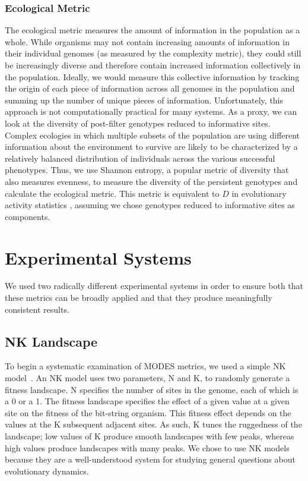 \documentclass[letterpaper]{article}
\begin{document}
\subsubsection{Ecological Metric}
The ecological metric measures the amount of information in the population as a whole. While organisms may not contain increasing amounts of information in their individual genomes (as measured by the complexity metric), they could still be increasingly diverse and therefore contain increased information collectively in the population. Ideally, we would measure this collective information by tracking the origin of each piece of information across all genomes in the population and summing up the number of unique pieces of information. Unfortunately, this approach is not computationally practical for many systems. As a proxy, we can look at the diversity of post-filter genotypes reduced to informative sites. Complex ecologies in which multiple subsets of the population are using different information about the environment to survive are likely to be characterized by a relatively balanced distribution of individuals across the various successful phenotypes. Thus, we use Shannon entropy, a popular metric of diversity that also measures evenness, to measure the diversity of the persistent genotypes and calculate the ecological metric. This metric is equivalent to $D$ in evolutionary activity statistics \citep{bedau_comparison_1997}, assuming we chose genotypes reduced to informative sites as components.

\section{Experimental Systems}

We used two radically different experimental systems in order to ensure both that these metrics can be broadly applied and that they produce meaningfully consistent results.

\subsection{NK Landscape}
To begin a systematic examination of MODES metrics, we used a simple NK model~\citep{kauffman_towards_1987}. An NK model uses two parameters, N and K, to randomly generate a fitness landscape. N specifies the number of sites in the genome, each of which is a 0 or a 1. The fitness landscape specifies the effect of a given value at a given site on the fitness of the bit-string organism. This fitness effect depends on the values at the K subsequent adjacent sites. As such, K tunes the ruggedness of the landscape; low values of K produce smooth landscapes with few peaks, whereas high values produce landscapes with many peaks. We chose to use NK models because they are a well-understood system for studying general questions about evolutionary dynamics.
\end{document}
